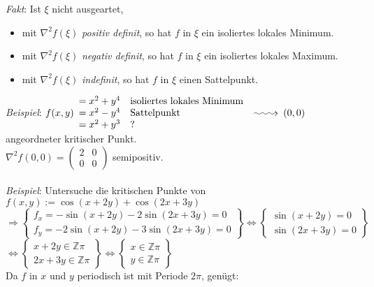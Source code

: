 \documentclass[12pt,a4paper,titlepage]{article}
\makeatletter
\newcommand{\longsquiggly}{\xymatrix{{}\ar@{~>}[r]&{}}}
\newcommand{\setZ}{\mathbb{Z}}
\makeatother
\begin{document}
\textit{Fakt}: Ist $\xi$ nicht ausgeartet,
\begin{itemize}
\item mit $\nabla^2f(\xi)$ \emph{positiv definit}, so hat $f$ in $\xi$ ein isoliertes lokales Minimum.
\item mit $\nabla^2f(\xi)$ \emph{negativ definit}, so hat $f$ in $\xi$ ein isoliertes lokales Maximum.
\item mit $\nabla^2f(\xi)$ \emph{indefinit}, so hat $f$ in $\xi$ einen Sattelpunkt.
\end{itemize}
\textit{Beispiel}: $f(x,y)\begin{array}{l l}
  =x^2+y^4 & \text{isoliertes lokales Minimum} \\
  =x^2-y^4 & \text{Sattelpunkt} \\
  =x^2+y^3 & \text{?}
\end{array}\longsquiggly (0,0)$ angeordneter kritischer Punkt. \\
$\nabla^2f(0,0)=\begin{pmatrix}2&0\\0&0\end{pmatrix}$ semipositiv. \\
\\
\textit{Beispiel}: Untersuche die kritischen Punkte von $f(x,y):=\cos(x+2y)+\cos(2x+3y)$ \\
$\Rightarrow\left\{\begin{array}{l}
  f_x=-\sin(x+2y)-2\sin(2x+3y)=0 \\
  f_y=-2\sin(x+2y)-3\sin(2x+3y)=0
\end{array}\right\}\iff\left\{\begin{array}{l}
  \sin(x+2y)=0 \\
  \sin(2x+3y)=0
\end{array}\right\}$ \\
$\iff\left\{\begin{array}{l}
  x+2y\in\setZ\pi \\
  2x+3y\in\setZ\pi
\end{array}\right\}\iff\left\{\begin{array}{l}
  x\in\setZ\pi \\
  y\in\setZ\pi
\end{array}\right\}$ \\
Da $f$ in $x$ und $y$ periodisch ist mit Periode $2\pi$, genügt: \\
\end{document}

